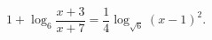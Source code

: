 \begin{ex}[type=equation]
	\begin{condition}
		$1 + \log_6 \dfrac{x + 3}{x + 7} = \dfrac{1}{4}\log_{\sqrt{6}}(x- 1)^2.$
	\end{condition}
\end{ex}